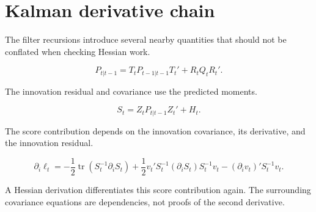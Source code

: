 \section{Kalman derivative chain}
The filter recursions introduce several nearby quantities that should not be conflated when checking Hessian work.

\begin{equation}\label{eq:kalman-prediction-covariance}
P_{t|t-1} = T_t P_{t-1|t-1}T_t' + R_t Q_t R_t'.
\end{equation}

The innovation residual and covariance use the predicted moments.

\begin{equation}\label{eq:kalman-innovation-covariance}
S_t = Z_t P_{t|t-1}Z_t' + H_t.
\end{equation}

The score contribution depends on the innovation covariance, its derivative, and the innovation residual.

\begin{equation}\label{eq:kalman-score-contribution}
\partial_i \ell_t
= -\frac{1}{2}\operatorname{tr}(S_t^{-1}\partial_i S_t)
+ \frac{1}{2}v_t' S_t^{-1}(\partial_i S_t)S_t^{-1}v_t
- (\partial_i v_t)'S_t^{-1}v_t.
\end{equation}

A Hessian derivation differentiates this score contribution again. The surrounding covariance equations are dependencies, not proofs of the second derivative.
